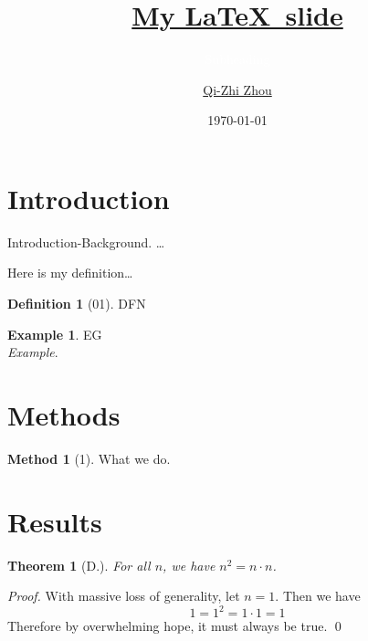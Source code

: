 \documentclass[aspectratio=169]{beamer}	%
\title{\textcolor{white}{\href{https://github.com/Veenxz/My_Beamer}{My \LaTeX\ slide}}}
\subtitle{\textcolor{white}{Subheading}}
\author{ \href {mailto:veenzhou@gmail.com}{Qi-Zhi Zhou}}
\date{\footnotesize \today}
\newcommand{\pf}{\noindent\emph{Proof. }}
\theoremstyle{plain}
\newtheorem{thm}{Theorem}[section]
\theoremstyle{definition}
\newtheorem{ex}{Example}[section]
\newtheorem{dfn}{Definition}[section]
\newtheorem{met}{Method}[section]
\theoremstyle{remark}
\numberwithin{equation}{section}
\begin{document}
\begin{frame}
\titlepage
\end{frame}



\section{Introduction}



\begin{frame}
Introduction-Background. \dots
\end{frame}



\begin{frame}
Here is my definition\dots

\begin{dfn}[01]
DFN
\end{dfn}

\begin{ex}
EG\\
\emph{Example}.
\end{ex}
\end{frame}



\section{Methods}



\begin{frame}
\begin{met}[1]
What we do.
\end{met}
\end{frame}



\section{Results}



\begin{frame}
\begin{thm}[D.]
For all $n$, we have $n^2= n \cdot n$.
\end{thm}

\pf With massive loss of generality, let $n=1$. Then we have
	\[
	1=1^2= 1 \cdot 1= 1
	\]
Therefore by overwhelming hope, it must always be true. \qed
\end{frame}
\end{document}
